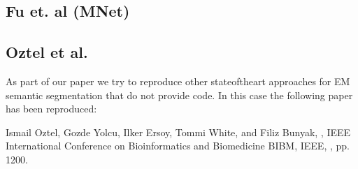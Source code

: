 \documentclass[letterpaper,10pt,english]{sphinxmanual}
\begin{document}
\subsection{Fu et. al (MNet)}
\label{\detokenize{sota_implementations/MNet_Fu_2018/MNet_Fu_2018:fu-et-al-mnet}}\label{\detokenize{sota_implementations/MNet_Fu_2018/MNet_Fu_2018::doc}}

\subsection{Oztel et al.}
\label{\detokenize{sota_implementations/oztel_2017/oztel:oztel-et-al}}\label{\detokenize{sota_implementations/oztel_2017/oztel::doc}}
As part of our paper we try to reproduce other state\sphinxhyphen{}of\sphinxhyphen{}the\sphinxhyphen{}art approaches for EM semantic segmentation
that do not provide code. In this case the following paper has been reproduced:

\begin{sphinxVerbatim}[commandchars=\\\{\}]
Ismail Oztel, Gozde Yolcu, Ilker Ersoy, Tommi White, and Filiz Bunyak, 
,
 IEEE International Conference on Bioinformatics and Biomedicine BIBM, IEEE,
, pp. \PYGZhy{}1200.
\end{sphinxVerbatim}

 
\end{document}
